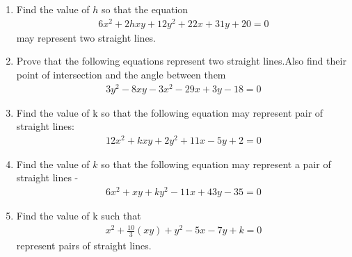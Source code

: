 \renewcommand{\theequation}{\theenumi}
\renewcommand{\thefigure}{\theenumi}
\begin{enumerate}[label=\thesection.\arabic*.,ref=\thesection.\theenumi]
%
\item 
Find the value of $h$ so that the equation 
\begin{align}
6x^2+2hxy+12y^2+22x+31y+20=0
\label{eq:solutions/13/ex2/question}
\end{align}
 may represent two straight lines.
\\
\solution

\item Prove that the following equations represent two straight lines.Also find their point of intersection and the angle between them
\begin{align}
 3y^2-8xy-3x^2-29x+3y-18=0   
\label{eq:solutions/13/3/1}
\end{align}
\solution

\item Find the value of k so that the following equation may represent pair of straight lines: 
\begin{align}
    12x^2+kxy+2y^2+11x-5y+2=0\label{eq:solutions/13/8/1.1}
\end{align}
\solution

%
\item Find the value of $k$ so that the following equation may represent a pair of straight lines - 
\begin{align}
6x^2 +xy+ky^2-11x+43y-35 = 0 \label{eq:solutions/13/94}
\end{align}
\solution



\item Find the value of k such that 
\begin{align}
x^{2}+ \frac{10}{3}(xy)+y^2 -5x -7y + k =0 \label{eq:solutions/13/11eq5}
\end{align}
 represent pairs of straight lines.
\solution

\end{enumerate}


